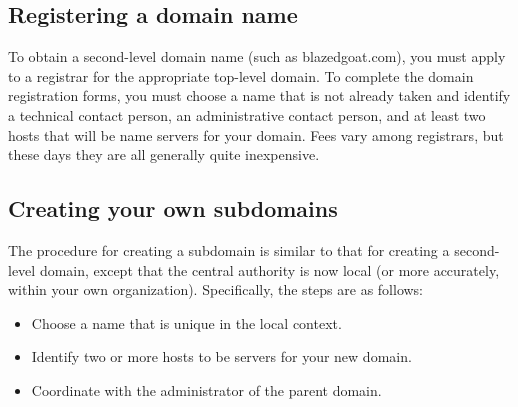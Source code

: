 \protect\hypertarget{part0024_split_008.html}{}{}

\hypertarget{part0024_split_008.htmlux5cux23_idContainer1069}{}
\hypertarget{part0024_split_008.htmlux5cux23calibre_pb_7}{%
\subsection[Registering a domain
name]{\texorpdfstring{\protect\hypertarget{part0024_split_008.htmlux5cux23_idTextAnchor851}{}{}Registering
a domain
name}{Registering a domain name}}\label{part0024_split_008.htmlux5cux23calibre_pb_7}}

\protect\hypertarget{part0024_split_008.htmlux5cux23_idIndexMarker2007}{}{}To
obtain a
\protect\hypertarget{part0024_split_008.htmlux5cux23_idIndexMarker2008}{}{}\protect\hypertarget{part0024_split_008.htmlux5cux23_idIndexMarker2009}{}{}second-level
domain name (such as blazedgoat.com), you must apply to a registrar for
the appropriate top-level domain. To complete the domain registration
forms, you must choose a name that is not already taken and identify a
technical contact person, an administrative contact person, and at least
two hosts that will be name servers for your domain. Fees vary among
registrars, but these days they are all generally quite inexpensive.

\protect\hypertarget{part0024_split_009.html}{}{}

\hypertarget{part0024_split_009.htmlux5cux23_idContainer1069}{}
\hypertarget{part0024_split_009.htmlux5cux23calibre_pb_8}{%
\subsection[Creating your own
subdomains]{\texorpdfstring{\protect\hypertarget{part0024_split_009.htmlux5cux23_idTextAnchor852}{}{}Creating
your own
subdomains}{Creating your own subdomains}}\label{part0024_split_009.htmlux5cux23calibre_pb_8}}

\protect\hypertarget{part0024_split_009.htmlux5cux23_idIndexMarker2010}{}{}\protect\hypertarget{part0024_split_009.htmlux5cux23_idIndexMarker2011}{}{}The
procedure for creating a subdomain is similar to that for creating a
second-level domain, except that the central authority is now local (or
more accurately, within your own organization). Specifically, the steps
are as follows:

\begin{itemize}
\item
  Choose a name that is unique in the local context.
\item
  Identify two or more hosts to be servers for your new domain.
\item
  Coordinate with the administrator of the parent domain.
\end{itemize}

